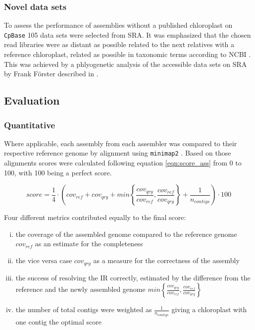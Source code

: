 \subsubsection{Novel data sets}

To assess the performance of assemblies without a published chloroplast on \texttt{CpBase}
\cite{cpbase} 105 data sets were selected from SRA. It was emphasized that the chosen read
libraries were as distant as possible related to the next relatives with a reference
chloroplast, related as possible in taxonomic terms according to NCBI
\cite{ncbitaxonomy}. This was achieved by a phlyogenetic analysis of the accessible data
sets on SRA by Frank F\"orster described in \cite{freudenthal2019landscape}.

\subsection{Evaluation}
\subsubsection{Quantitative}
Where applicable, each assembly from each assembler was compared to their respective
reference genome by alignment using \texttt{minimap2} \cite{li2018minimap2}. Based on
those alignments scores were calculated following equation \ref{eqn:score_ass} from 0 to
100, with 100 being a perfect score.

\begin{equation}
  score = \frac{1}{4} \cdot \left( cov_{ref} +  cov_{qry} + min\left\{ \frac{cov_{qry}}{cov_{ref}}, \frac{cov_{ref}}{cov_{qry}}\right\} + \frac{1}{n_{contigs} }\right) \cdot 100
  \label{eqn:score_ass}
\end{equation}

Four different metrics contributed equally to the final score:

\begin{enumerate}[(i)]
\item the coverage of the assembled genome compared to the reference genome $cov_{ref}$ as
  an estimate for the completeness
\item the vice versa case $cov_{qry}$ as a measure for the correctness of the assembly 
\item the success of resolving the IR correctly, estimated by the difference from the
  reference and the newly assembled genome
  $min\left\{ \frac{cov_{qry}}{cov_{ref}}, \frac{cov_{ref}}{cov_{qry}}\right\}$
\item the number of total contigs were weighted as $\frac{1}{n_{contigs}}$ giving a
  chloroplast with one contig the optimal score
\end{enumerate}

